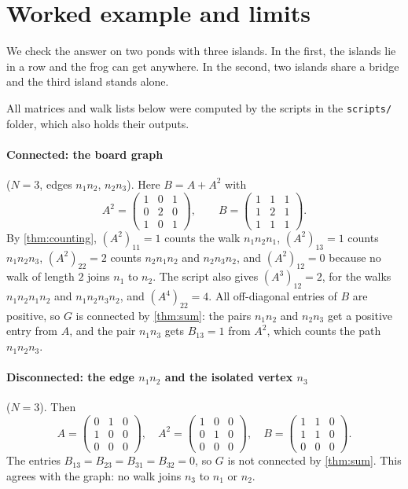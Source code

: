 \section{Worked example and limits}\label{sec:example}

\plainwords{} We check the answer on two ponds with three islands. In the first, the islands lie in a row and the frog can get anywhere. In the second, two islands share a bridge and the third island stands alone.

All matrices and walk lists below were computed by the scripts in the
\texttt{scripts/} folder, which also holds their outputs.

\paragraph{Connected: the board graph} ($N=3$, edges $n_1n_2$, $n_2n_3$).
Here $B=A+A^2$ with
\[
A^2=\begin{pmatrix}1&0&1\\0&2&0\\1&0&1\end{pmatrix},\qquad
B=\begin{pmatrix}1&1&1\\1&2&1\\1&1&1\end{pmatrix}.
\]
By \cref{thm:counting}, $(A^2)_{11}=1$ counts the walk
$n_1n_2n_1$, $(A^2)_{13}=1$ counts $n_1n_2n_3$, $(A^2)_{22}=2$ counts
$n_2n_1n_2$ and $n_2n_3n_2$, and $(A^2)_{12}=0$ because no walk of length $2$
joins $n_1$ to $n_2$. The script also gives $(A^3)_{12}=2$, for the walks
$n_1n_2n_1n_2$ and $n_1n_2n_3n_2$, and $(A^4)_{22}=4$. All off-diagonal entries of $B$ are positive, so $G$ is
connected by \cref{thm:sum}: the pairs $n_1n_2$ and $n_2n_3$ get a positive
entry from $A$, and the pair $n_1n_3$ gets $B_{13}=1$ from $A^2$, which counts
the path $n_1n_2n_3$.

\paragraph{Disconnected: the edge $n_1n_2$ and the isolated vertex $n_3$}
($N=3$). Then
\[
A=\begin{pmatrix}0&1&0\\1&0&0\\0&0&0\end{pmatrix},\quad
A^2=\begin{pmatrix}1&0&0\\0&1&0\\0&0&0\end{pmatrix},\quad
B=\begin{pmatrix}1&1&0\\1&1&0\\0&0&0\end{pmatrix}.
\]
The entries $B_{13}=B_{23}=B_{31}=B_{32}=0$, so $G$ is not connected by
\cref{thm:sum}. This agrees with the graph: no walk joins $n_3$ to $n_1$ or $n_2$.

